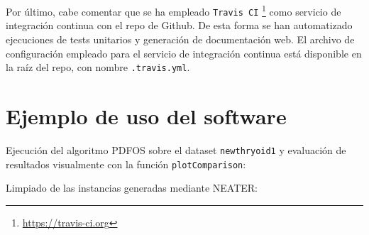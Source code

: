 Por último, cabe comentar que se ha empleado \texttt{Travis CI} \footnote{\url{https://travis-ci.org}} como servicio de integración
continua con el repo de Github. De esta forma se han automatizado ejecuciones de tests unitarios y generación de documentación web. El
archivo de configuración empleado para el servicio de integración continua está disponible en la raíz del repo, con nombre 
\texttt{.travis.yml}.

\section{Ejemplo de uso del software}
Ejecución del algoritmo PDFOS sobre el dataset \texttt{newthryoid1} y evaluación de resultados visualmente con la función
\texttt{plotComparison}:



Limpiado de las instancias generadas mediante NEATER:


